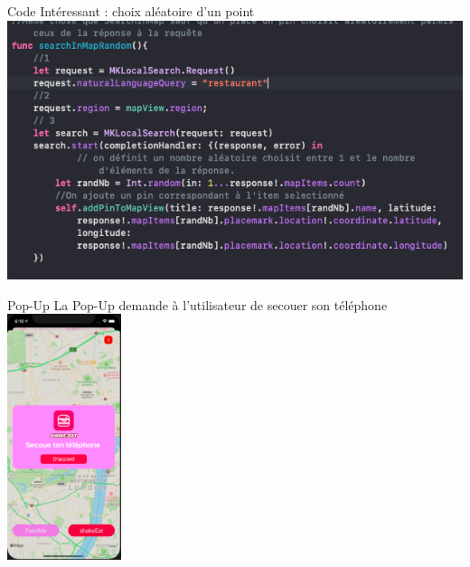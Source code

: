     \begin{frame}{Code Intéressant : choix aléatoire d'un point}
        \centering
            \includegraphics[height = 0.6 \textheight]{images/code-aleatoire.png}
    \end{frame}
    
    
    \begin{frame}{Pop-Up}
        La Pop-Up demande à l'utilisateur de secouer son téléphone
        \centering
        \includegraphics[width = 0.25\textwidth]{images/carte-post-shake.png}
    \end{frame}
    
    
    
    
    
    
    